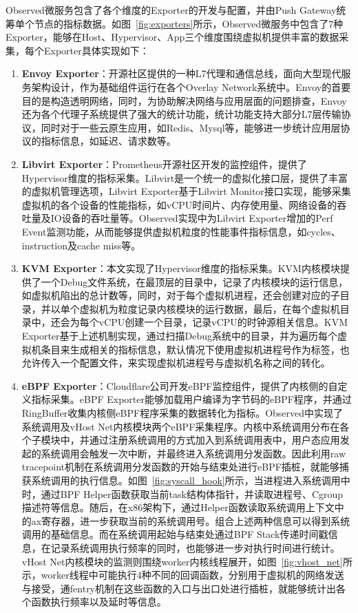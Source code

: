 Observed微服务包含了各个维度的Exporter的开发与配置，并由Push Gateway统筹单个节点的指标数据。如图~\ref{fig:exporters}所示，Observed微服务中包含了7种Exporter，能够在Host、Hypervisor、App三个维度围绕虚拟机提供丰富的数据采集，每个Exporter具体实现如下：

\begin{enumerate}

    \item \textbf{Envoy Exporter}：开源社区提供的一种L7代理和通信总线，面向大型现代服务架构设计，作为基础组件运行在各个Overlay Network系统中。Envoy的首要目的是构造透明网络，同时，为协助解决网络与应用层面的问题排查，Envoy还为各个代理子系统提供了强大的统计功能，统计功能支持大部分L7层传输协议，同时对于一些云原生应用，如Redis、Mysql等，能够进一步统计应用层协议的指标信息，如延迟、请求数等。
    
    \item \textbf{Libvirt Exporter}：Prometheus开源社区开发的监控组件，提供了Hypervisor维度的指标采集。Libvirt是一个统一的虚拟化接口层，提供了丰富的虚拟机管理选项，Libvirt Exporter基于Libvirt Monitor接口实现，能够采集虚拟机的各个设备的性能指标，如vCPU时间片、内存使用量、网络设备的吞吐量及IO设备的吞吐量等。Observed实现中为Libvirt Exporter增加的Perf Event监测功能，从而能够提供虚拟机粒度的性能事件指标信息，如cycles、instruction及cache miss等。
    
    \item \textbf{KVM Exporter}：本文实现了Hypervisor维度的指标采集。KVM内核模块提供了一个Debug文件系统，在最顶层的目录中，记录了内核模块的运行信息，如虚拟机陷出的总计数等，同时，对于每个虚拟机进程，还会创建对应的子目录，并以单个虚拟机为粒度记录内核模块的运行数据，最后，在每个虚拟机目录中，还会为每个vCPU创建一个目录，记录vCPU的时钟源相关信息。KVM Exporter基于上述机制实现，通过扫描Debug系统中的目录，并为遍历每个虚拟机条目来生成相关的指标信息，默认情况下使用虚拟机进程号作为标签，也允许传入一个配置文件，来实现虚拟机进程号与虚拟机名称之间的转化。

    \item \textbf{eBPF Exporter}：Cloudflare公司开发eBPF监控组件，提供了内核侧的自定义指标采集。eBPF Exporter能够加载用户编译为字节码的eBPF程序，并通过RingBuffer收集内核侧eBPF程序采集的数据转化为指标。Observed中实现了系统调用及vHost Net内核模块两个eBPF采集程序。内核中系统调用分布在各个子模块中，并通过注册系统调用的方式加入到系统调用表中，用户态应用发起的系统调用会触发一次中断，并最终进入系统调用分发函数。因此利用raw tracepoint机制在系统调用分发函数的开始与结束处进行eBPF插桩，就能够捕获系统调用的执行信息。如图~\ref{fig:syscall_hook}所示，当进程进入系统调用中时，通过BPF Helper函数获取当前task结构体指针，并读取进程号、Cgroup描述符等信息。随后，在x86架构下，通过Helper函数读取系统调用上下文中的ax寄存器，进一步获取当前的系统调用号。组合上述两种信息可以得到系统调用的基础信息。而在系统调用起始与结束处通过BPF Stack传递时间戳信息，在记录系统调用执行频率的同时，也能够进一步对执行时间进行统计。vHost Net内核模块的监测则围绕worker内核线程展开，如图~\ref{fig:vhost_net}所示，worker线程中可能执行4种不同的回调函数，分别用于虚拟机的网络发送与接受，通fentry机制在这些函数的入口与出口处进行插桩，就能够统计出各个函数执行频率以及延时等信息。


\end{enumerate}
